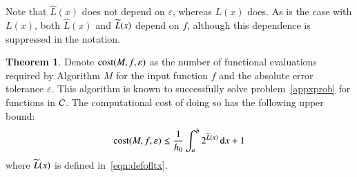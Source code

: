 \documentclass[review]{elsarticle}
\newcommand{\abstol}{\varepsilon}
\theoremstyle{definition}
\newcommand{\chL}{\widehat{L}}
\newtheorem{theorem}{Theorem}
\begin{document}
Note that $\chL(x)$ does not depend on $\abstol$, whereas $L(x)$ does. As is the
case with $L(x)$, both $\chL(x)$ and $\widetilde{L}(x)$ depend on $f$, although this
dependence is suppressed in the notation.

\begin{theorem}\label{thm:Mcost}
	Denote $\cost(M,f,\abstol)$ as the number of functional evaluations required by Algorithm $M$ for the input function $f$ and the absolute error tolerance $\abstol$.  This algorithm is known to successfully solve problem~\eqref{appxprob} for functions in $\mathcal{C}$.  The computational cost of doing so has the following upper bound:
	\begin{equation*}
	\cost(M,f,\abstol) \le \frac{1}{h_0}\int_a^b 2^{\tL(x)} \, \dif x +1 \\
	\end{equation*}
	where $\widetilde{L}(x)$ is defined in~\eqref{eqn:defofltx}.
\end{theorem}
\end{document}
